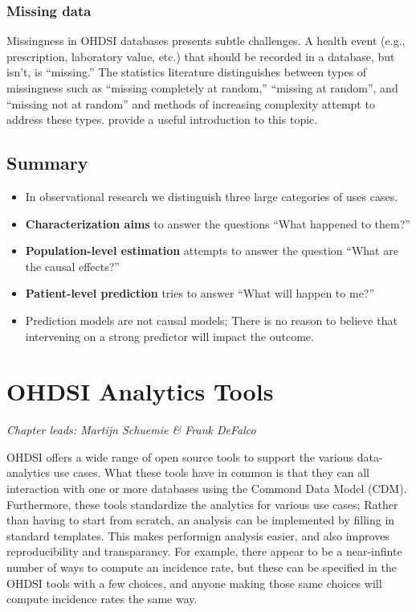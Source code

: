 \documentclass[11pt]{book}
\theoremstyle{definition}
\theoremstyle{definition}
\theoremstyle{definition}
\theoremstyle{remark}
\let\BeginKnitrBlock\begin \let\EndKnitrBlock\end
\begin{document}
\hypertarget{missing-data}{%
\subsection{Missing data}\label{missing-data}}

Missingness in OHDSI databases presents subtle challenges. A health event (e.g., prescription, laboratory value, etc.) that should be recorded in a database, but isn't, is ``missing.'' The statistics literature distinguishes between types of missingness such as ``missing completely at random,'' ``missing at random'', and ``missing not at random'' and methods of increasing complexity attempt to address these types. \citet{perkins2017principled} provide a useful introduction to this topic.

\hypertarget{summary-2}{%
\section{Summary}\label{summary-2}}

\BeginKnitrBlock{rmdsummary}
\begin{itemize}
\item
  In observational research we distinguish three large categories of uses cases.
\item
  \textbf{Characterization aims} to answer the questions ``What happened to them?''
\item
  \textbf{Population-level estimation} attempts to answer the question ``What are the causal effects?''
\item
  \textbf{Patient-level prediction} tries to answer ``What will happen to me?''
\item
  Prediction models are not causal models; There is no reason to believe that intervening on a strong predictor will impact the outcome.
\end{itemize}
\EndKnitrBlock{rmdsummary}

\hypertarget{OhdsiAnalyticsTools}{%
\chapter{OHDSI Analytics Tools}\label{OhdsiAnalyticsTools}}

\emph{Chapter leads: Martijn Schuemie \& Frank DeFalco}

OHDSI offers a wide range of open source tools to support the various data-analytics use cases. What these tools have in common is that they can all interaction with one or more databases using the Commond Data Model (CDM). Furthermore, these tools standardize the analytics for various use cases; Rather than having to start from scratch, an analysis can be implemented by filling in standard templates. This makes performign analysis easier, and also improves reproducibility and transparancy. For example, there appear to be a near-infinte number of ways to compute an incidence rate, but these can be specified in the OHDSI tools with a few choices, and anyone making those same choices will compute incidence rates the same way.
\end{document}
